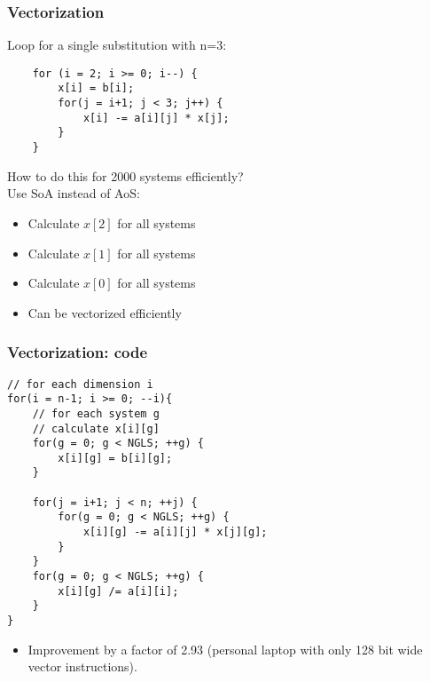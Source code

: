 \begin{frame}[fragile]
\frametitle{Vectorization}
Loop for a single substitution with n=3:
\codestylec
\begin{lstlisting}
    for (i = 2; i >= 0; i--) {
        x[i] = b[i];
        for(j = i+1; j < 3; j++) {
            x[i] -= a[i][j] * x[j];
        }
    }                  
\end{lstlisting}
How to do this for 2000 systems efficiently?\\
Use SoA instead of AoS:
\begin{itemize}
\item Calculate $x[2]$ for all systems
\item Calculate $x[1]$ for all systems
\item Calculate $x[0]$ for all systems
\item Can be vectorized efficiently
\end{itemize}
\end{frame}

\begin{frame}[fragile]
\frametitle{Vectorization: code}

\codestylec
\begin{lstlisting}
// for each dimension i
for(i = n-1; i >= 0; --i){
    // for each system g
    // calculate x[i][g]
    for(g = 0; g < NGLS; ++g) {
        x[i][g] = b[i][g];
    }

    for(j = i+1; j < n; ++j) {
        for(g = 0; g < NGLS; ++g) {
	        x[i][g] -= a[i][j] * x[j][g];
        }
    }
    for(g = 0; g < NGLS; ++g) {
        x[i][g] /= a[i][i];
    }
}
\end{lstlisting}

\begin{itemize}
\item Improvement by a factor of 2.93 (personal laptop with only 128 bit wide vector instructions).
\end{itemize}
\end{frame}
